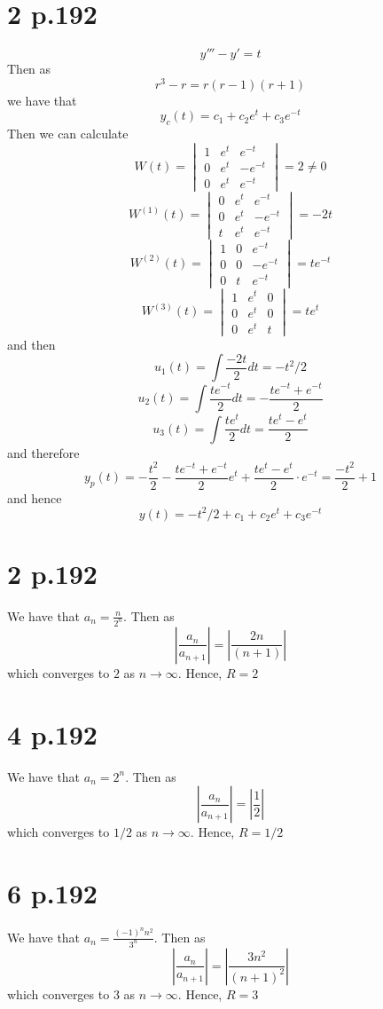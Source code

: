 \documentclass[11pt]{article}
\begin{document}
\section*{2 p.192}
\[
    y'''-y' =t    
\]
Then as 
\[
    r^3-r = r(r-1)(r+1)     
\]
we have that 
\[
    y_c(t) = c_1 + c_2e^t + c_3e^{-t}
\]
Then we can calculate
\[
    W(t) = 
    \begin{vmatrix}
        1 & e^t & e^{-t} \\
        0 & e^t & -e^{-t} \\
        0 & e^t & e^{-t}     
    \end{vmatrix} 
    = 2 \ne 0
\]
\[
    W^{(1)}(t) = 
    \begin{vmatrix}
        0 & e^t & e^{-t} \\
        0 & e^t & -e^{-t} \\
        t & e^t & e^{-t}     
    \end{vmatrix} 
    = -2t
\]
\[
    W^{(2)}(t) = 
    \begin{vmatrix}
        1 & 0 & e^{-t} \\
        0 & 0 & -e^{-t} \\
        0 & t & e^{-t} 
    \end{vmatrix} 
    = te^{-t}
\]
\[
    W^{(3)}(t) = 
    \begin{vmatrix}
        1 & e^t & 0  \\
        0 & e^t & 0 \\
        0 & e^t & t     
    \end{vmatrix} 
    = te^t
\]
and then 
\[
    u_1(t) = \int \frac{-2t}{2} dt = -t^2/2
\]
\[
    u_2(t) = \int \frac{te^{-t}}{2} dt = -\frac{te^{-t} + e^{-t}}{2} 
\]
\[
    u_3(t) = \int \frac{te^t}{2} dt = \frac{te^t - e^t}{2}
\]
and therefore
\[
    y_p(t) = - \frac{t^2}{2} - \frac{te^{-t} + e^{-t}}{2} e^t + \frac{te^t -e^t}{2} \cdot e^{-t} = \frac{-t^2}{2} + 1    
\]
and hence
\[
    y(t) = -t^2/2 + c_1 + c_2e^t + c_3e^{-t}
\]
\newpage
\section*{2 p.192}
We have that $a_n = \frac{n}{2^n}$. Then as 
\[
    \left| \frac{a_n}{a_{n+1}} \right| =\left| \frac{2n}{(n+1)}\right|  
\]
which converges to $2$ as $n \to \infty$. Hence, $R=2$
\section*{4 p.192}
We have that $a_n = 2^n$. Then as 
\[
    \left| \frac{a_n}{a_{n+1}} \right| =\left| \frac{1}{2}\right|  
\]
which converges to $1/2$ as $n \to \infty$. Hence, $R=1/2$
\section*{6 p.192}
We have that $a_n = \frac{(-1)^n n^2}{3^n}$. 
Then as 
\[
    \left| \frac{a_n}{a_{n+1}} \right| =\left| \frac{3n^2}{(n+1)^2}\right|  
\]
which converges to $3$ as $n \to \infty$. Hence, $R=3$
\end{document}
